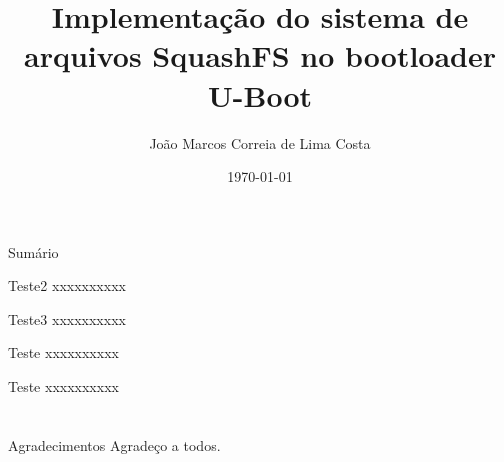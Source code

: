 \documentclass[handout,t]{beamer}
\title[Trabalho de conclusão de curso]{
	Implementação do sistema de arquivos SquashFS no bootloader U-Boot}
\date{
	\today}
\author[João Marcos Correia de Lima Costa]{
	João Marcos Correia de Lima Costa %
	}
\institute[INSTITUTO]{
	\vspace{0.25cm}
	Departamento de Engenharia Elétrica\\
	Universidade Federal do Rio Grande do Norte}
\begin{document}
\frame{\titlepage}
\section[]{}
\begin{frame}{Sumário}
	\tableofcontents
\end{frame}








\begin{frame}{Teste2}
xxxxxxxxxx    
\end{frame}

\begin{frame}{Teste3}
xxxxxxxxxx    
\end{frame}

\begin{frame}{Teste}
xxxxxxxxxx    
\end{frame}

\begin{frame}{Teste}
xxxxxxxxxx    
\end{frame}
\section{}
\begin{frame}{Agradecimentos}
	Agradeço a todos. 	
\end{frame}
\end{document}

